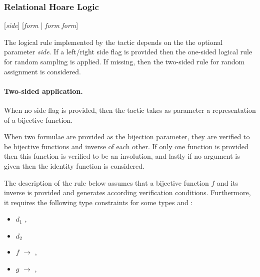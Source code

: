 
\subsubsection{Relational Hoare Logic}

\Syntax {}[\textit{side}] [\textit{form} | \textit{form} \textit{form}]

\Description

The logical rule implemented by the  tactic depends on the
the optional parameter \textit{side}. If a left/right side flag is
provided then the one-sided logical rule for random sampling is
applied. If missing, then the two-sided rule for random assignment is
considered.
%

\paragraph*{Two-sided application.} 
When no side flag is provided, then the  tactic takes as
parameter a representation of a bijective function.

When two formulae are provided as the bijection parameter,
they are verified to be bijective functions and inverse of each
other. If only one function is provided then this function is verified
to be an involution, and lastly if no argument is given then the
identity function is considered.

The description of the rule below assumes that a bijective function
$f$ and its inverse is provided and generates according verification
conditions. Furthermore, it requires the following type constraints
for some types  and : 
\begin{itemize}
\item $d_1$ , 
\item $d_2$ 
\item $f$  $\to$ ,
\item $g$  $\to$ , 
\end{itemize}

